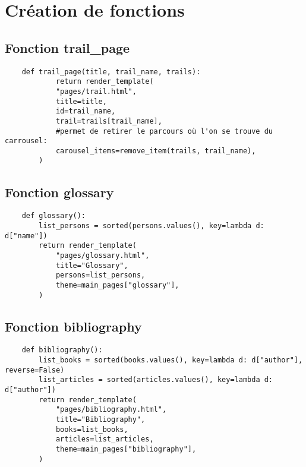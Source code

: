 	\chapter{\label{Fonctions}Création de fonctions}
	
	\section{Fonction trail\_page}
	\begin{verbatim}
    def trail_page(title, trail_name, trails):
            return render_template(
            "pages/trail.html",
            title=title,
            id=trail_name,
            trail=trails[trail_name],            
            #permet de retirer le parcours où l'on se trouve du carrousel:
            carousel_items=remove_item(trails, trail_name),
        )
    \end{verbatim}
    
	\section{Fonction glossary}
	\begin{verbatim}
    def glossary():
        list_persons = sorted(persons.values(), key=lambda d: d["name"])
        return render_template(
            "pages/glossary.html",
            title="Glossary",
            persons=list_persons,
            theme=main_pages["glossary"],
        )
    \end{verbatim}
    
	\section{Fonction bibliography}
    \begin{verbatim}
    def bibliography():
        list_books = sorted(books.values(), key=lambda d: d["author"], reverse=False)
        list_articles = sorted(articles.values(), key=lambda d: d["author"])
        return render_template(
            "pages/bibliography.html",
            title="Bibliography",
            books=list_books,
            articles=list_articles,
            theme=main_pages["bibliography"],
        )
    \end{verbatim}
